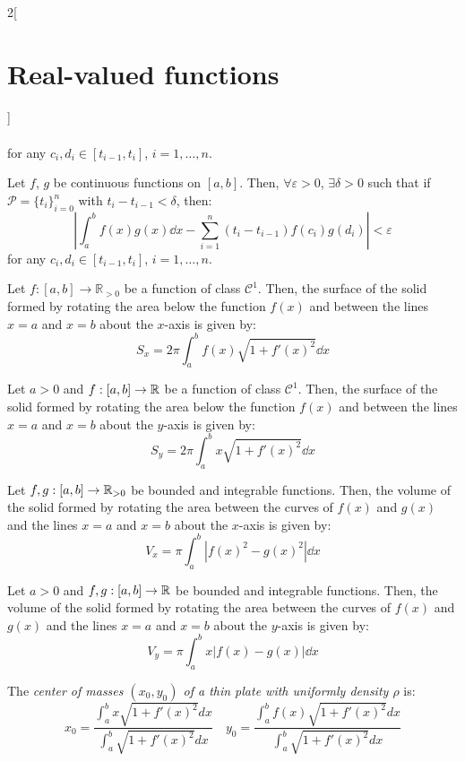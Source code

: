 \documentclass[../../../main.tex]{subfiles}
\begin{document}
\begin{multicols}{2}[\section{Real-valued functions}]
\begin{lemma}
\begin{multline*}
    \end{multline*}
    for any $c_i,d_i\in[t_{i-1},t_i]$, $i=1,\ldots,n$.
\end{lemma}
\begin{lemma}
    Let $f$, $g$ be continuous functions on $[a,b]$. Then, $\forall\varepsilon>0$, $\exists\delta>0$ such that if $\mathcal{P}=\{t_i\}_{i=0}^n$ with $t_i-t_{i-1}<\delta$, then: 
    $$\left|\int_a^bf(x)g(x)\dd x-\sum_{i=1}^n(t_i-t_{i-1})f(c_i)g(d_i)\right|<\varepsilon$$
    for any $c_i,d_i\in[t_{i-1},t_i]$, $i=1,\ldots,n$.
\end{lemma}
\begin{prop}
    Let $f:[a,b]\rightarrow\mathbb{R}_{>0}$ be a function of class $\mathcal{C}^1$. Then, the surface of the solid formed by rotating the area below the function $f(x)$ and between the lines $x = a$ and $x = b$ about the $x$-axis is given by: $$S_x=2\pi\int_a^bf(x)\sqrt{1+{f'(x)}^2}\dd x$$
\end{prop}
\begin{prop}
    Let $a>0$ and $f:[a,b]\rightarrow\mathbb{R}$ be a function of class $\mathcal{C}^1$. Then, the surface of the solid formed by rotating the area below the function $f(x)$ and between the lines $x = a$ and $x = b$ about the $y$-axis is given by: $$S_y=2\pi\int_a^bx\sqrt{1+{f'(x)}^2}\dd x$$
\end{prop}
\begin{prop}
    Let $f,g:[a,b]\rightarrow\mathbb{R}_{>0}$ be bounded and integrable functions. Then, the volume of the solid formed by rotating the area between the curves of $f(x)$ and $g(x)$ and the lines $x = a$ and $x = b$ about the $x$-axis is given by: $$V_x=\pi\int_a^b\left|{f(x)}^2-{g(x)}^2\right|\dd x$$
\end{prop}
\begin{prop}
    Let $a>0$ and $f,g:[a,b]\rightarrow\mathbb{R}$ be bounded and integrable functions. Then, the volume of the solid formed by rotating the area between the curves of $f(x)$ and $g(x)$ and the lines $x = a$ and $x = b$ about the $y$-axis is given by: $$V_y=\pi\int_a^bx\left|f(x)-g(x)\right|\dd x$$
\end{prop}
\begin{prop}
    The \textit{center of masses $(x_0,y_0)$ of a thin plate with uniformly density $\rho$} is: $$x_0=\frac{\displaystyle\int_a^bx\sqrt{1+{f'(x)}^2}dx}{\displaystyle\int_a^b\sqrt{1+{f'(x)}^2}dx}\quad y_0=\frac{\displaystyle\int_a^b f(x)\sqrt{1+{f'(x)}^2}dx}{\displaystyle\int_a^b\sqrt{1+{f'(x)}^2}dx}$$
\end{prop}

\end{multicols}
\end{document}
